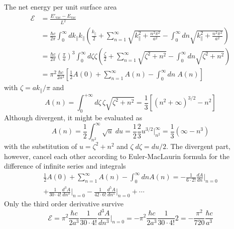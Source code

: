 \documentclass[../../../main.tex]{subfiles}
\begin{document}
The net energy per unit surface area
\begin{align*}
  \mathcal{E} & =  \frac{E'_{\text{vac}} - E_{\text{vac}}}{L^2}                                                                                                                                                                                                                          \\
              & =  \frac{\hbar c}{2\pi}  \int_{0}^{\infty} dk_{\parallel}k_{\parallel} \left( \frac{k_{\parallel}}{2} + \sum_{n=1}^{\infty} \sqrt{k_{\parallel} ^{2}+ \frac{n^{2} \pi^{2}}{a^{2}}}  -\int_{0}^{\infty} dn \sqrt{k_{\parallel}^{2} + \frac{n^{2} \pi^{2}}{a^{2}}} \right) \\
              & =  \frac{\hbar c}{2\pi} \left( \frac{\pi}{a } \right) ^{3} \int_{0}^{\infty} d\zeta \zeta \left( \frac{\zeta}{2} + \sum_{n=1}^{\infty} \sqrt{\zeta ^{2}+ n^2}  -\int_{0}^{\infty} dn \sqrt{\zeta^{2} + n^2} \right)                                                      \\
              & =\pi^2 \frac{\hbar c }{2a^3} \left[ \frac{1}{2} A(0) + \sum_{n=1}^{\infty} A(n) - \int_{0}^{\infty} dn\; A(n) \right]
\end{align*}
with \( \zeta = a k_{\parallel}/\pi \) and
\begin{equation*}
  A(n) = \int_{0}^{+\infty} d\zeta \, \zeta \sqrt{\zeta^2 + n^2}
  = \frac{1}{3} \left[ (n^2 + \infty)^{3/2} - n^2 \right]
\end{equation*}
Although divergent, it might be evaluated as
\begin{equation*}
  A(n)=  \frac{1}{2} \int_{n^{2}}^{\infty} \sqrt{u} \; du= \frac{1 }{2 }\frac{2 }{3 }u^{3/2}\bigg|_{n^2 }^{\infty }=
  \frac{1 }{3 }\left( \infty-n^3 \right)
\end{equation*}
with the substitution of $u = \zeta^{2} + n^{2} $ and $\zeta\;d\zeta=du/2$.
The divergent part, however, cancel each other according to Euler-MacLaurin formula for the difference of infinite series and integrals
\begin{multline*}
  \frac{1}{2} A(0) + \sum_{n=1}^{\infty} A(n) - \int_{0}^{\infty} dn A(n) = -\frac{1}{6 \cdot 2!} \frac{dA}{dn}\bigg|_{n=0} \\
  + \frac{1}{30 \cdot 4!} \frac{d^3 A}{dn^3}\bigg|_{n=0} - \frac{1}{42\cdot 6!}  \frac{d^5 A}{dn^5}\bigg|_{n=0} + \cdots
\end{multline*}
Only the third order derivative survive
\begin{equation*}
  \mathcal{E}
  =\pi^2 \frac{\hbar c }{2a^3} \frac{1}{30 \cdot 4!} \frac{d^3 A}{dn^3}\bigg|_{n=0}
  =-\pi^2 \frac{\hbar c }{2a^3} \frac{1}{30 \cdot 4!} 2
  = -\frac{\pi^2 }{720 }\frac{\hbar c }{a^3}
\end{equation*}
\end{document}
